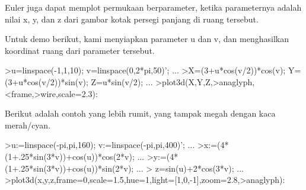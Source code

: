 \documentclass[a4paper,10pt]{article}
\begin{document}
\begin{eulernotebook}
\begin{eulercomment}
\begin{eulercomment}
\begin{eulercomment}
\begin{eulercomment}
\begin{eulercomment}
\begin{eulercomment}
\begin{eulercomment}
\begin{eulercomment}
\begin{eulercomment}
\begin{eulercomment}
\begin{eulercomment}
\begin{eulercomment}
\begin{eulercomment}
\begin{eulercomment}
\begin{eulercomment}
\begin{eulercomment}
\begin{eulercomment}
\begin{eulercomment}
\begin{eulercomment}
\begin{eulercomment}
\begin{eulercomment}
\begin{eulercomment}
\begin{eulercomment}
\begin{eulercomment}
\begin{eulercomment}
\begin{eulercomment}
\begin{eulercomment}
\begin{eulercomment}
\begin{eulercomment}
\begin{eulercomment}
\begin{eulercomment}
\begin{eulercomment}
\begin{eulercomment}
\begin{eulercomment}
\begin{eulercomment}
\begin{eulercomment}
\begin{eulercomment}
\begin{eulercomment}
\begin{eulercomment}
\begin{eulercomment}
\begin{eulercomment}
Euler juga dapat memplot permukaan berparameter, ketika parameternya
adalah nilai x, y, dan z dari gambar kotak persegi panjang di ruang
tersebut.

Untuk demo berikut, kami menyiapkan parameter u dan v, dan
menghasilkan koordinat ruang dari parameter tersebut.
\end{eulercomment}
\begin{eulerprompt}
>u=linspace(-1,1,10); v=linspace(0,2*pi,50)'; ...
>X=(3+u*cos(v/2))*cos(v); Y=(3+u*cos(v/2))*sin(v); Z=u*sin(v/2); ...
>plot3d(X,Y,Z,>anaglyph,<frame,>wire,scale=2.3):
\end{eulerprompt}
\begin{eulercomment}
Berikut adalah contoh yang lebih rumit, yang tampak megah dengan kaca
merah/cyan.
\end{eulercomment}
\begin{eulerprompt}
>u:=linspace(-pi,pi,160); v:=linspace(-pi,pi,400)';  ...
>x:=(4*(1+.25*sin(3*v))+cos(u))*cos(2*v); ...
>y:=(4*(1+.25*sin(3*v))+cos(u))*sin(2*v); ...
> z=sin(u)+2*cos(3*v); ...
>plot3d(x,y,z,frame=0,scale=1.5,hue=1,light=[1,0,-1],zoom=2.8,>anaglyph):
\end{eulerprompt}
\begin{eulercomment}

\end{eulercomment}
\end{eulercomment}
\end{eulercomment}
\end{eulercomment}
\end{eulercomment}
\end{eulercomment}
\end{eulercomment}
\end{eulercomment}
\end{eulercomment}
\end{eulercomment}
\end{eulercomment}
\end{eulercomment}
\end{eulercomment}
\end{eulercomment}
\end{eulercomment}
\end{eulercomment}
\end{eulercomment}
\end{eulercomment}
\end{eulercomment}
\end{eulercomment}
\end{eulercomment}
\end{eulercomment}
\end{eulercomment}
\end{eulercomment}
\end{eulercomment}
\end{eulercomment}
\end{eulercomment}
\end{eulercomment}
\end{eulercomment}
\end{eulercomment}
\end{eulercomment}
\end{eulercomment}
\end{eulercomment}
\end{eulercomment}
\end{eulercomment}
\end{eulercomment}
\end{eulercomment}
\end{eulercomment}
\end{eulercomment}
\end{eulercomment}
\end{eulercomment}
\end{eulernotebook}
\end{document}
